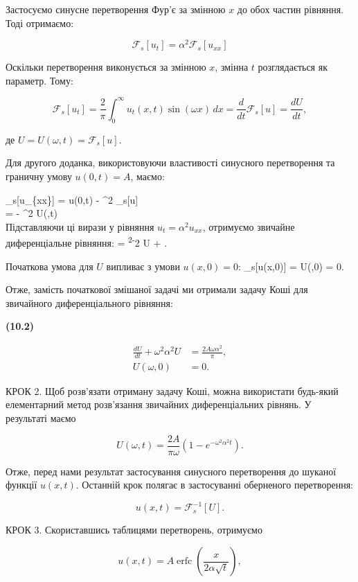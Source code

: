 \documentclass[
  ukrainian,
]{article}
\begin{document}
Застосуємо синусне перетворення Фур'є за змінною \(x\) до обох частин
рівняння. Тоді отримаємо:

\[
\mathcal{F}_s[u_t] = \alpha^2 \mathcal{F}_s[u_{xx}]
\]

Оскільки перетворення виконується за змінною \(x\), змінна \(t\)
розглядається як параметр. Тому:

\[
\mathcal{F}_s[u_t]  
= \frac{2}{\pi}\int_{0}^{\infty} u_t(x,t)\sin(\omega x)\,dx  
= \frac{d}{dt}\mathcal{F}_s[u]  
= \frac{dU}{dt},
\]

де \(U = U(\omega, t) = \mathcal{F}_s[u]\).

Для другого доданка, використовуючи властивості синусного перетворення
та граничну умову \(u(0,t)=A\), маємо:

\_s{[}u\_\{xx\}{]} = \omega u(0,t) - \omega\^{}2
\_s{[}u{]}\\
=  - \omega\^{}2 U(\omega,t)\\
Підставляючи ці вирази у рівняння \(u_t = \alpha^2 u_{xx}\), отримуємо
звичайне диференціальне рівняння:  =
\alpha\textsuperscript{2\left{[}-\omega}2 U +
\right{]}.

Початкова умова для \(U\) випливає з умови \(u(x,0)=0\):
\_s{[}u(x,0){]} = U(\omega,0) = 0.

Отже, замість початкової змішаної задачі ми отримали задачу Коші для
звичайного диференціального рівняння:

\textbf{(10.2)}

\[
\begin{aligned}
\frac{dU}{dt} + \omega^2 \alpha^2 U &= \frac{2A\omega \alpha^2}{\pi}, \\
U(\omega,0) &= 0.
\end{aligned}
\]

КРОК 2. Щоб розв'язати отриману задачу Коші, можна використати будь-який
елементарний метод розв'язання звичайних диференціальних рівнянь. У
результаті маємо

\[
U(\omega,t)=\frac{2A}{\pi\omega}\left(1-e^{-\omega^2\alpha^2 t}\right).
\]

Отже, перед нами результат застосування синусного перетворення до
шуканої функції \(u(x,t)\). Останній крок полягає в застосуванні
оберненого перетворення:

\[
u(x,t)=\mathcal{F}_s^{-1}[U].
\]

КРОК 3. Скориставшись таблицями перетворень, отримуємо

\[
u(x,t)=A\operatorname{erfc}\!\left(\frac{x}{2\alpha\sqrt{t}}\right),
\]
\end{document}

